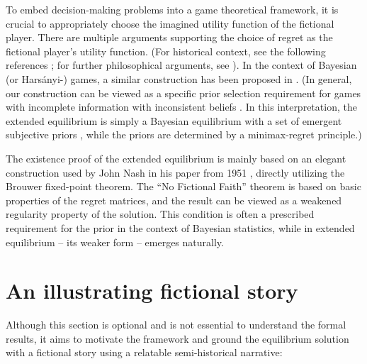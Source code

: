 \documentclass{article}
\theoremstyle{definition}
\begin{document}
To embed decision-making problems into a game theoretical framework, it is crucial to appropriately choose the imagined utility function of the fictional player. There are multiple arguments supporting the choice of regret as the fictional player's utility function. (For historical context, see the following references \cite{book:Savage,paper:MinimaxRegretNiehans1948,book:CoxStatistics}; for further philosophical arguments, see \cite{essay:EssayOnUncertaintyKonczer2024}). 
In the context of Bayesian (or Harsányi-) games, a similar construction has been proposed in \cite{arxiv:Hyafil2012Regret}.
(In general, our construction can be viewed as a specific prior selection requirement for games with incomplete information with inconsistent beliefs \cite{book:GameTheory}. In this interpretation, the extended equilibrium is simply a Bayesian equilibrium with a set of emergent subjective priors \cite{book:GameTheory}, while the priors are determined by a minimax-regret principle.)


The existence proof of the extended equilibrium is mainly based on an elegant construction used by John Nash in his paper from 1951 \cite{paper:Nash1951}, directly utilizing the Brouwer fixed-point theorem.
The ``No Fictional Faith'' theorem is based on basic properties of the regret matrices, and the result can be viewed as a weakened regularity property of the solution. This condition is often a prescribed requirement for the prior in the context of Bayesian statistics, while in extended equilibrium -- its weaker form -- emerges naturally.

\section{An illustrating fictional story}

Although this section is optional and is not essential to understand the formal results,
it aims to motivate the framework and ground the equilibrium solution with a fictional story using a relatable semi-historical narrative:
\end{document}
